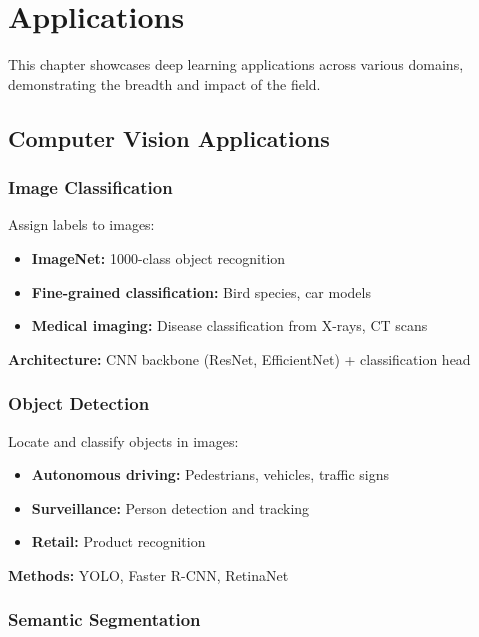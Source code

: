 
\chapter{Applications}
\label{chap:applications}

This chapter showcases deep learning applications across various domains, demonstrating the breadth and impact of the field.

\section{Computer Vision Applications}
\label{sec:cv-applications}

\subsection{Image Classification}

Assign labels to images:
\begin{itemize}
    \item \textbf{ImageNet:} 1000-class object recognition
    \item \textbf{Fine-grained classification:} Bird species, car models
    \item \textbf{Medical imaging:} Disease classification from X-rays, CT scans
\end{itemize}

\textbf{Architecture:} CNN backbone (ResNet, EfficientNet) + classification head

\subsection{Object Detection}

Locate and classify objects in images:
\begin{itemize}
    \item \textbf{Autonomous driving:} Pedestrians, vehicles, traffic signs
    \item \textbf{Surveillance:} Person detection and tracking
    \item \textbf{Retail:} Product recognition
\end{itemize}

\textbf{Methods:} YOLO, Faster R-CNN, RetinaNet

\subsection{Semantic Segmentation}

